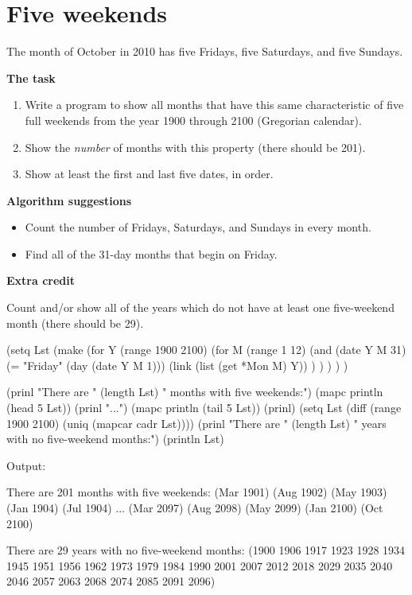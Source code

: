 \pagebreak{}
\section*{Five weekends}

The month of October in 2010 has five Fridays, five Saturdays, and five
Sundays.

\textbf{The task}

\begin{enumerate}
\item
  Write a program to show all months that have this same characteristic
  of five full weekends from the year 1900 through 2100 (Gregorian
  calendar).
\item
  Show the \emph{number} of months with this property (there should be
  201).
\item
  Show at least the first and last five dates, in order.
\end{enumerate}

\textbf{Algorithm suggestions}

\begin{itemize}
\item
  Count the number of Fridays, Saturdays, and Sundays in every month.
\item
  Find all of the 31-day months that begin on Friday.
\end{itemize}

\textbf{Extra credit}

Count and/or show all of the years which do not have at least one
five-weekend month (there should be 29).

\begin{wideverbatim}

(setq Lst
   (make
      (for Y (range 1900 2100)
         (for M (range 1 12)
            (and
               (date Y M 31)
               (= "Friday" (day (date Y M 1)))
               (link (list (get *Mon M) Y)) ) ) ) ) )

(prinl "There are " (length Lst) " months with five weekends:")
(mapc println (head 5 Lst))
(prinl "...")
(mapc println (tail 5 Lst))
(prinl)
(setq Lst (diff (range 1900 2100) (uniq (mapcar cadr Lst))))
(prinl "There are " (length Lst) " years with no five-weekend months:")
(println Lst)

Output:

There are 201 months with five weekends:
(Mar 1901)
(Aug 1902)
(May 1903)
(Jan 1904)
(Jul 1904)
...
(Mar 2097)
(Aug 2098)
(May 2099)
(Jan 2100)
(Oct 2100)

There are 29 years with no five-weekend months:
(1900 1906 1917 1923 1928 1934 1945 1951 1956 1962 1973 1979 1984 1990 2001 2007
2012 2018 2029 2035 2040 2046 2057 2063 2068 2074 2085 2091 2096)

\end{wideverbatim}

